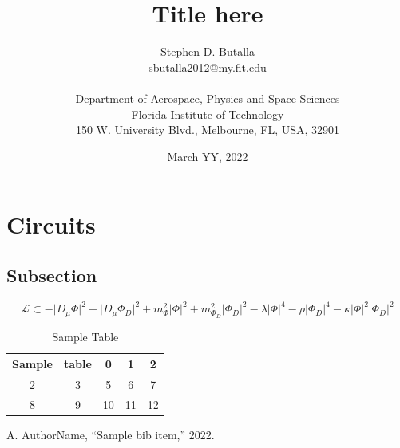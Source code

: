 \documentclass[10pt]{article}
\title{Title here}
\author{Stephen D. Butalla\\ \normalsize{\url{sbutalla2012@my.fit.edu}}\\~\\
\normalsize{Department of Aerospace, Physics and Space Sciences}\\ \normalsize{Florida Institute of Technology}\\\normalsize{150 W. University Blvd., Melbourne, FL, USA,  32901}}
\date{March YY, 2022}
\begin{document}
\maketitle
\newpage
\tableofcontents
\newpage

\section{Circuits}
\lipsum
\subsection{Subsection}
\lipsum[0]
\begin{equation}\label{eqn:Higgslagrangian} 
\mathcal{L}\subset - \big|D_{\mu}\Phi\big|^{2} + \big|D_{\mu}\Phi_{D}\big|^{2} + m_{\Phi}^{2}\big|\Phi\big|^{2}+ m_{\Phi_{D}}^{2}\big|\Phi_{D}\big|^{2}-\lambda\big|\Phi\big|^{4}-\rho\big|\Phi_{D}\big|^{4}-\kappa\big|\Phi\big|^{2}\big|\Phi_{D}\big|^{2}
\end{equation}





\begin{table}[!ht]
\caption{Sample Table}
\label{tab:sampleTable} 
\centering
\begin{tabular}{c c| c c c} 
\hline
Sample 	& table		&  0 & 1 & 2\\
\hline
2		& 3					& 5		& 6		& 7\\
8		& 9 				& 10		& 11	& 12\\
\hline 
\end{tabular}
\end{table}


%
%



\begin{thebibliography}{14} 
 A. AuthorName, ``Sample bib item,'' 2022.
\end{thebibliography}
\end{document}
